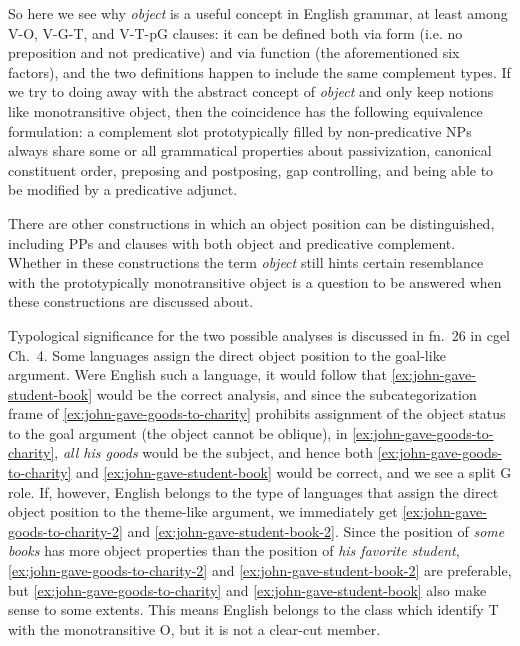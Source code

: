 \documentclass[UTF8, a4paper, oneside, scheme=plain, 12pt]{ctexbook}
\newcommand*{\citechap}[1]{Ch.~{#1}}
\newcommand*{\citefootnote}[1]{fn.~{#1}}
\newcommand*{\term}[1]{\emph{#1}}
\newcommand{\form}[1]{\emph{#1}}
\begin{document}
So here we see why \term{object} is a useful concept in English grammar,
at least among V-O, V-G-T, and V-T-pG clauses:
it can be defined both via form (i.e. no preposition and not predicative)
and via function (the aforementioned six factors),
and the two definitions happen to include the same complement types.
If we try to doing away with the abstract concept of \term{object}
and only keep notions like monotransitive object,
then the coincidence has the following equivalence formulation:
a complement slot prototypically filled by non-predicative NPs
always share some or all grammatical properties
about passivization, canonical constituent order,
preposing and postposing, gap controlling, 
and being able to be modified by a predicative adjunct. 

There are other constructions in which an object position can be distinguished,
including PPs and clauses with both object and predicative complement. %
Whether in these constructions the term \term{object} still hints 
certain resemblance with the prototypically monotransitive object 
is a question to be answered when these constructions are discussed about.


Typological significance for the two possible analyses is discussed in
\citefootnote{26} in \ac{cgel} \citechap{4}.
Some languages assign the direct object position to the goal-like argument.
Were English such a language, 
it would follow that \eqref{ex:john-gave-student-book} would be the correct analysis,
and since the subcategorization frame of \eqref{ex:john-gave-goods-to-charity} 
prohibits assignment of the object status to the goal argument
(the object cannot be oblique),
in \eqref{ex:john-gave-goods-to-charity},
\form{all his goods} would be the subject,
and hence both \eqref{ex:john-gave-goods-to-charity} and \eqref{ex:john-gave-student-book} 
would be correct,
and we see a split G role.
If, however, English belongs to the type of languages 
that assign the direct object position to the theme-like argument,
we immediately get \eqref{ex:john-gave-goods-to-charity-2} and \eqref{ex:john-gave-student-book-2}.
Since the position of \form{some books} has more object properties 
than the position of \form{his favorite student},
\eqref{ex:john-gave-goods-to-charity-2} and \eqref{ex:john-gave-student-book-2} are preferable,
but \eqref{ex:john-gave-goods-to-charity} and \eqref{ex:john-gave-student-book} also make sense 
to some extents.
This means English belongs to the class which identify T with the monotransitive O, 
but it is not a clear-cut member.
\end{document}
